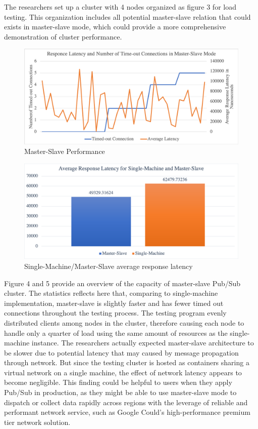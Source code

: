 The researchers set up a cluster with 4 nodes organized as figure 3 for load testing. This organization includes all potential master-slave relation that could exists in master-slave mode, which could provide a more comprehensive demonstration of cluster performance.
	
\begin{figure}[H]
	\centering
	\includegraphics[scale=0.33]{figure/master_slave/performance.png}
	\caption{Master-Slave Performance}
\end{figure}

\begin{figure}[H]
	\centering
	\includegraphics[scale=0.33]{figure/master_slave/response_latency.png}
	\caption{Single-Machine/Master-Slave average response latency}
\end{figure}

Figure 4 and 5 provide an overview of the capacity of master-slave Pub/Sub cluster. The statistics reflects here that, comparing to single-machine implementation, master-slave is slightly faster and has fewer timed out connections throughout the testing process. The testing program evenly distributed clients among nodes in the cluster, therefore causing each node  to handle only a quarter of load using the same amount of resources as the single-machine instance. The researchers actually expected master-slave architecture to be slower due to potential latency that may caused by message propagation through network. But since the testing cluster is hosted as containers sharing a virtual network on a single machine, the effect of network latency appears to become negligible. This finding could be helpful to users when they apply Pub/Sub in production, as they might be able to use master-slave mode to dispatch or collect data rapidly across regions with the leverage of reliable and performant network service, such as Google Could's high-performance premium tier network solution\citep{google-cloud-network}.

